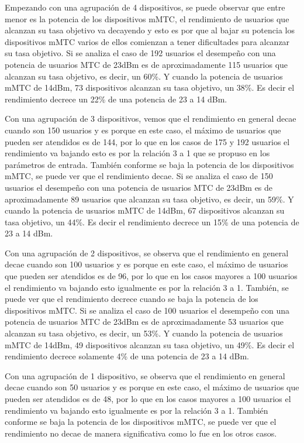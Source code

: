 Empezando con una agrupación de 4 dispositivos, se puede observar que entre menor es la potencia de los dispositivos mMTC, el rendimiento de usuarios que alcanzan su tasa objetivo va decayendo y esto es por que al bajar su potencia los dispositivos mMTC varios de ellos comienzan a tener dificultades para alcanzar su tasa objetivo. Si se analiza el caso de 192 usuarios el desempeño con una potencia de usuarios MTC de 23dBm es de aproximadamente 115 usuarios que alcanzan su tasa objetivo, es decir, un 60\%. Y cuando la potencia de usuarios mMTC de 14dBm, 73 dispositivos alcanzan su tasa objetivo, un 38\%. Es decir el rendimiento decrece un 22\% de una potencia de 23 a 14 dBm.\newline

Con una agrupación de 3 dispositivos, vemos que el rendimiento en general decae cuando son 150 usuarios y es porque en este caso, el máximo de usuarios que pueden ser atendidos es de 144, por lo que en los casos de 175 y 192 usuarios el rendimiento va bajando esto es por la relación 3 a 1 que se propuso en los parámetros de entrada. También conforme se baja la potencia de los dispositivos mMTC, se puede ver que el rendimiento decae. Si se analiza el caso de 150 usuarios el desempeño con una potencia de usuarios MTC de 23dBm es de aproximadamente 89 usuarios que alcanzan su tasa objetivo, es decir, un 59\%. Y cuando la potencia de usuarios mMTC de 14dBm, 67 dispositivos alcanzan su tasa objetivo, un 44\%. Es decir el rendimiento decrece un 15\% de una potencia de 23 a 14 dBm.\newline

Con una agrupación de 2 dispositivos, se observa que el rendimiento en general decae cuando son 100 usuarios y es porque en este caso, el máximo de usuarios que pueden ser atendidos es de 96, por lo que en los casos mayores a 100 usuarios el rendimiento va bajando esto igualmente es por la relación 3 a 1. También, se puede ver que el rendimiento decrece cuando se baja la potencia de los dispositivos mMTC. Si se analiza el caso de 100 usuarios el desempeño con una potencia de usuarios MTC de 23dBm es de aproximadamente 53 usuarios que alcanzan su tasa objetivo, es decir, un 53\%. Y cuando la potencia de usuarios mMTC de 14dBm, 49 dispositivos alcanzan su tasa objetivo, un 49\%. Es decir el rendimiento decrece solamente 4\% de una potencia de 23 a 14 dBm.\newline

Con una agrupación de 1 dispositivo, se observa que el rendimiento en general decae cuando son 50 usuarios y es porque en este caso, el máximo de usuarios que pueden ser atendidos es de 48, por lo que en los casos mayores a 100 usuarios el rendimiento va bajando esto igualmente es por la relación 3 a 1. También conforme se baja la potencia de los dispositivos mMTC, se puede ver que el rendimiento no decae de manera significativa como lo fue en los otros casos. \newline


